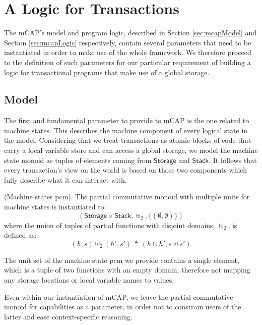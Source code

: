 \section{A Logic for Transactions}

\label{sec:transLogic}

The mCAP's model and program logic, described in Section \ref{sec:mcapModel} and Section \ref{sec:mcapLogic} respectively, contain several parameters that need to be instantiated in order to make use of the whole framework. We therefore proceed to the definition of such parameters for our particular requirement of building a logic for transactional programs that make use of a global storage.

\subsection{Model}

\label{sec:transLogicMod}

The first and fundamental parameter to provide to mCAP is the one related to machine states. This describes the machine component of every logical state in the model. Considering that we treat transactions as atomic blocks of code that carry a local variable store and can access a global storage, we model the machine state monoid as tuples of elements coming from $\mathsf{Storage}$ and $\mathsf{Stack}$. It follows that every transaction's view on the world is based on those two components which fully describe what it can interact with.
\begin{defn}
	(Machine states pcm).
	The partial commutative monoid with multiple units for machine states is instantiated to:
	\[
		(\mathsf{Storage} \times \mathsf{Stack}, \uplus_2, \{ (\emptyset, \emptyset) \})
	\]
	where the union of tuples of partial functions with disjoint domains, $\uplus_2$, is defined as:
	\[
		(h, s) \uplus_2 (h', s') \triangleq (h \uplus h', s \uplus s')
	\]
\end{defn}
The unit set of the machine state pcm we provide contains a single element, which is a tuple of two functions with an empty domain, therefore not mapping any storage locations or local variable names to values.

Even within our instantiation of mCAP, we leave the partial commutative monoid for capabilities as a parameter, in order not to constrain users of the latter and ease context-specific reasoning.

